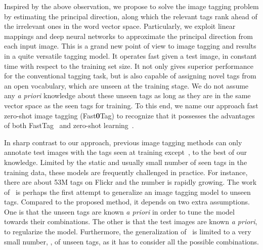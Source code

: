 \documentclass[10pt,twocolumn,letterpaper]{article}
\newcommand{\eat}[1]{{}}
\begin{document}
Inspired by the above observation, we propose to solve the image tagging problem by estimating the principal direction, along which the relevant tags rank ahead of the irrelevant ones in the word vector space. Particularly, we exploit linear mappings and  deep neural networks to approximate the principal direction from each input  image. This is a grand new point of view to image tagging and results in a quite versatile tagging model. It operates fast given a test image, in constant time with respect to the training set size. It not only gives superior performance for the conventional tagging task, but  is also capable of assigning  novel tags from an open vocabulary, which are unseen at the training stage. We do not assume any \textit{a priori} knowledge about these unseen tags as long as they are in the same vector space as the seen tags for training. To this end, we name our approach fast zero-shot image tagging (Fast\textbf{0}Tag) to recognize that it possesses the advantages of both FastTag~\cite{chen_fast_2013} and zero-shot learning~\cite{lampert_attribute-based_2014,fu_transductive_2014,fu_transductive_2015}. 




In sharp contrast to our approach, previous image tagging methods can only annotate test images with the  tags seen at training except~\cite{fu_transductive_2015}, to the best of our knowledge. Limited by the static and usually small number of seen tags in the training data, these models are frequently challenged in practice. For instance, there are about 53M tags on Flickr and the number is rapidly growing. \eat{See Section~\ref{sRelated} for more discussion.} The work of~\cite{fu_transductive_2015} is perhaps the first attempt to generalize an image tagging model to unseen tags. Compared to the proposed method, it depends on two extra assumptions. One is that the unseen tags are known \textit{a priori} in order to tune the model towards their combinations. The other is that the test images are known \textit{a priori}, to regularize the model. Furthermore, the generalization of~\cite{fu_transductive_2015} is limited to a very small number, , of unseen tags, as it has to consider all the  possible combinations.
\end{document}
